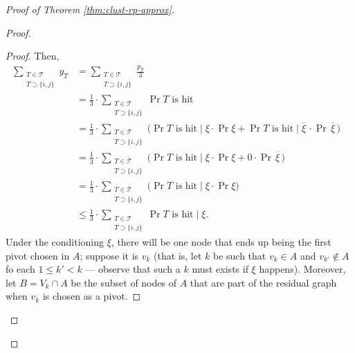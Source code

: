 \begin{proof}[Proof of Theorem \ref{thm:clust-rp-approx}]
\begin{proof}
\begin{proof}
            Then,
            \begin{align*}
                \sum_{\substack{T \in \mathscr{T}\\T \supset \{i,j\}}} y_T &= \sum_{\substack{T \in \mathscr{T}\\T \supset \{i,j\}}} \frac{p_T}3&\\
                &=\frac13 \cdot \sum_{\substack{T \in \mathscr{T}\\T \supset \{i,j\}}} \Pr{T \text{ is hit}}&\\
                &=\frac13 \cdot \sum_{\substack{T \in \mathscr{T}\\T \supset \{i,j\}}} \Big( \Pr{T \text{ is hit} \mid \xi} \cdot \Pr{\xi} +  \Pr{T \text{ is hit} \mid \overline{\xi}\,} \cdot \Pr{\,\overline{\xi}\,} \Big)&\tag{by total probability}\\
                &=\frac13 \cdot \sum_{\substack{T \in \mathscr{T}\\T \supset \{i,j\}}} \Big( \Pr{T \text{ is hit} \mid \xi} \cdot \Pr{\xi} + 0 \cdot \Pr{\,\overline{\xi}\,}\Big)&\\
                &=\frac13 \cdot \sum_{\substack{T \in \mathscr{T}\\T \supset \{i,j\}}} \Big( \Pr{T \text{ is hit} \mid \xi} \cdot \Pr{\xi}\Big)&\\
                &\le \frac13 \cdot \sum_{\substack{T \in \mathscr{T}\\T \supset \{i,j\}}} \Pr{T \text{ is hit} \mid \xi}.&
            \end{align*}
            Under the conditioning $\xi$, there will be one node that ends up being the first  pivot chosen in $A$; suppose it is $v_k$ (that is, let $k$ be such that $v_k \in A$ and $v_{k'} \not\in A$ fo each $1 \le k' < k$ --- observe that such a $k$ must exists if $\xi$ happens).
            Moreover, let $B = V_k \cap A$ be the subset of nodes of $A$ that are part of the residual graph when $v_k$ is chosen as a pivot.
        

\end{proof}
\end{proof}
\end{proof}
